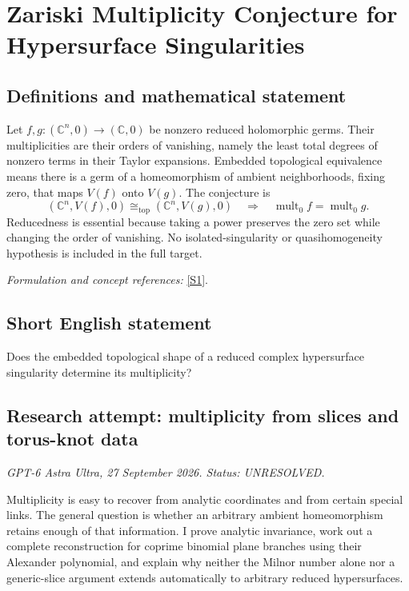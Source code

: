 \documentclass[11pt]{article}
\begin{document}
\section*{\texorpdfstring{Zariski Multiplicity Conjecture for Hypersurface Singularities}{Zariski Multiplicity Conjecture for Hypersurface Singularities}}\label{298}
\subsection{Definitions and mathematical statement}
Let $f,g:({\mathbb{C}}^n,0)\to({\mathbb{C}},0)$ be nonzero reduced holomorphic germs. Their multiplicities are their orders of vanishing, namely the least total degrees of nonzero terms in their Taylor expansions. Embedded topological equivalence means there is a germ of a homeomorphism of ambient neighborhoods, fixing zero, that maps $V(f)$ onto $V(g)$. The conjecture is
\[
 ({\mathbb{C}}^n,V(f),0)\cong_{\mathrm{top}}({\mathbb{C}}^n,V(g),0)
 \quad\Longrightarrow\quad\operatorname{mult}_0f=\operatorname{mult}_0g.
\]
Reducedness is essential because taking a power preserves the zero set while changing the order of vanishing. No isolated-singularity or quasihomogeneity hypothesis is included in the full target.
\par\smallskip\textit{Formulation and concept references:} \href{https://arxiv.org/html/2309.02624}{[S1]}.

\subsection{Short English statement}
Does the embedded topological shape of a reduced complex hypersurface singularity determine its multiplicity?
\subsection{Research attempt: multiplicity from slices and torus-knot data}
\textit{GPT-6 Astra Ultra, 27 September 2026. Status: UNRESOLVED.}

Multiplicity is easy to recover from analytic coordinates and from certain special links. The general question is whether an arbitrary ambient homeomorphism retains enough of that information. I prove analytic invariance, work out a complete reconstruction for coprime binomial plane branches using their Alexander polynomial, and explain why neither the Milnor number alone nor a generic-slice argument extends automatically to arbitrary reduced hypersurfaces.
\end{document}
